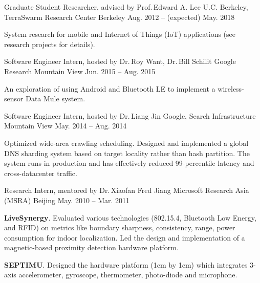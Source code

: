 
\begin{cventries}

  \cventry
  {Graduate Student Researcher, advised by Prof.\,Edward A. Lee}
  {U.C. Berkeley, TerraSwarm Research Center}
  {Berkeley}
  {Aug. 2012 -- (expected) May. 2018}
  {
    \begin{cvitems}
      System research for mobile and Internet of Things (IoT) applications (see
      research projects for details).
    \end{cvitems}
  }

  \cventry
  {Software Engineer Intern, hosted by Dr.\,Roy Want, Dr.\,Bill Schilit}
  {Google Research}
  {Mountain View}
  {Jun. 2015 -- Aug. 2015}
  {
    \begin{cvitems}
      An exploration of using Android and Bluetooth LE to implement a
      wireless-sensor Data Mule system.
    \end{cvitems}
  }

  \cventry
  {Software Engineer Intern, hosted by Dr.\,Liang Jin}
  {Google, Search Infrastructure}
  {Mountain View}
  {May. 2014 -- Aug. 2014}
  {
    \begin{cvitems}
      Optimized wide-area crawling scheduling. Designed and implemented a global
      DNS sharding system based on target locality rather than hash
      partition. The system runs in production and has effectively reduced
      99-percentile latency and cross-datacenter traffic.
    \end{cvitems}
  }

  \cventry
  {Research Intern, mentored by Dr.\,Xiaofan Fred Jiang}
  {Microsoft Research Asia (MSRA)}
  {Beijing}
  {May. 2010 -- Mar. 2011}
  {
    \begin{cvitems}
      \item \textbf{LiveSynergy}. Evaluated various technologies (802.15.4, Bluetooth
      Low Energy, and RFID) on metrics like boundary sharpness, consistency,
      range, power consumption for indoor localization. Led the design and
      implementation of a magnetic-based proximity detection hardware platform.
      \item \textbf{SEPTIMU}. Designed the hardware platform (1cm by 1cm) which
      integrates 3-axis accelerometer, gyroscope, thermometer, photo-diode and
      microphone.
    \end{cvitems}
  }

\end{cventries}

